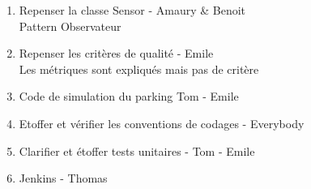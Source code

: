 \documentclass[10pt,a4paper]{article}
\begin{document}
\begin{enumerate}
\item Repenser la classe Sensor - Amaury \& Benoit\\
Pattern Observateur 

\item Repenser les critères de qualité - Emile\\
Les métriques sont expliqués mais pas de critère

\item Code de simulation du parking Tom - Emile\\

\item Etoffer et vérifier les conventions de codages - Everybody

\item Clarifier et étoffer tests unitaires - Tom - Emile\\

\item Jenkins - Thomas 
\end{enumerate}
\end{document}
